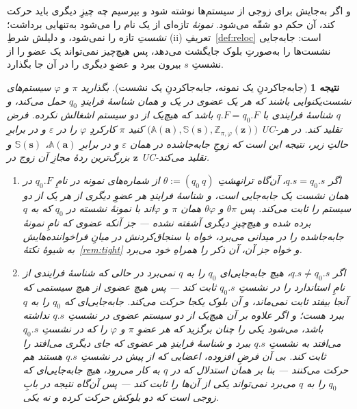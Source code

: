 \documentclass[10pt,oneside,openany]{book}
\newcommand{\bd}[1]{\mathbf{#1}}
\newcommand{\Aset}{\mathbb{A}}
\newcommand{\SimSet}{\mathbb{S}}
\newcommand{\ZenvSet}{\mathbb{Z}}
\theoremstyle{accentdef}
\theoremstyle{accentplain}
\newtheorem{corollary}[definition]{نتیجه}
\begin{document}
و اگر به‌جایش برای زوجی از سیستم‌ها نوشته شود و بپرسیم چه چیزِ دیگری باید
حرکت کند، آن حکم دو شقّه می‌شود. \emph{نمونهٔ} تازه‌ای از یک نام را می‌شود
به‌تنهایی برداشت؛ \emph{نشستِ} تازه را نمی‌شود، و دلیلش شرطِ (ii)ِ
تعریفِ~\ref{def:reloc} است: جابه‌جایی نشست‌ها را به‌صورتِ بلوک جایگشت
می‌دهد، پس هیچ‌چیز نمی‌تواند یک عضو را از نشستِ $s$ بیرون ببرد و عضوِ دیگری
را در آن جا بگذارد.

\begin{corollary}[جابه‌جاکردنِ یک نمونه، جابه‌جاکردنِ یک نشست]\label{cor:moveone}
بگذارید $\pi$ و $\varphi$ سیستم‌های نشست‌یکنوایی باشند که هر یک عضوی در یک و
همان شناسهٔ فرایندِ $q_0$ حمل می‌کند، و $q$ شناسهٔ فرایندی با $q.F = q_0.F$
باشد که هیچ‌یک از دو سیستم اشغالش نکرده. فرض کنید $\pi$ کارکردِ $\varphi$ را
در $\varepsilon$ و در برابرِ
$\bigl(\Aset(\bd{a}),\SimSet(\bd{s}),\ZenvSet_{\pi,\varphi}(\bd{z})\bigr)$
UC-تقلید کند. در هر حالتِ زیر، نتیجه این است که زوجِ جابه‌جا‌شده در همان
$\varepsilon$ و در برابرِ $\Aset(\bd{a})$، $\SimSet(\bd{s})$ و بزرگ‌ترین ردهٔ
مجازِ آن زوج در $\bd{z}$ UC-تقلید می‌کند.
\begin{enumerate}[label=(\roman*),leftmargin=2.2em]
  \item اگر $q.s = q_0.s$، آن‌گاه ترانهشتِ $\theta := (q_0\ q)$ از شماره‌های نمونه در
        نامِ $q_0.F$ در همان نشست یک جابه‌جایی است، و شناسهٔ فرایندِ هر عضوِ دیگری از هر
        یک از دو سیستم را ثابت می‌کند. پس $\theta\pi$ و $\theta\varphi$ همان $\pi$ و
        $\varphi$اند با نمونهٔ نشسته در $q_0$ که به $q$ برده شده و هیچ‌چیزِ دیگری آشفته
        نشده --- جز آنکه عضوی که نامِ نمونهٔ جابه‌جا‌شده را در میدانی می‌برد، خواه با
        سنجاق‌کردنش در میانِ فراخواننده‌هایش به شیوهٔ نکتهٔ~\ref{rem:tight} و خواه
        جز آن، آن ذکر را همراهِ خود می‌برد.
  \item اگر $q.s \neq q_0.s$، هیچ جابه‌جایی‌ای $q_0$ را به $q$ نمی‌برد در حالی که
        شناسهٔ فرایندی از نامِ استاندارد را در نشستِ $q_0.s$ ثابت کند --- پس هیچ عضوی از
        هیچ سیستمی که آنجا بیفتد ثابت نمی‌ماند، و آن بلوک یکجا حرکت می‌کند.
        جابه‌جایی‌ای که $q_0$ را به $q$ ببرد هست؛ و اگر علاوه بر آن هیچ‌یک از دو سیستم
        عضوی در نشستِ $q.s$ نداشته باشد، می‌شود یکی را چنان برگزید که هر عضوِ $\pi$ و
        $\varphi$ را که در نشستِ $q_0.s$ می‌افتد به نشستِ $q.s$ ببرد و شناسهٔ فرایندِ هر
        عضوی که جای دیگری می‌افتد را ثابت کند. بی آن فرضِ افزوده، اعضایی که از پیش در
        نشستِ $q.s$ هستند هم حرکت می‌کنند --- بنا بر همان استدلال که در $q$ به کار
        می‌رود، هیچ جابه‌جایی‌ای که $q_0$ را به $q$ می‌برد نمی‌تواند یکی از آن‌ها را
        ثابت کند --- پس آن‌گاه نتیجه در بابِ زوجی است که دو بلوکش حرکت کرده و نه یکی.
\end{enumerate}
\end{corollary}
\end{document}
